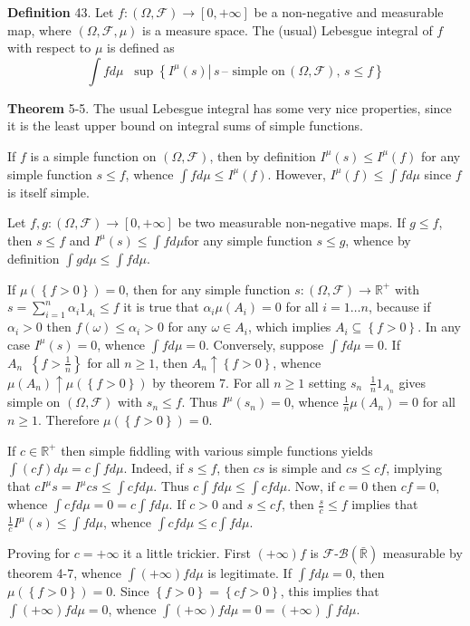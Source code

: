 \documentclass[a4paper]{article}
\newcommand{\obj}[1]{\left\{ #1 \right \}}
\newcommand{\clo}[1]{\left [ #1 \right ]}
\newcommand{\brac}[1]{\left ( #1 \right )}
\newcommand{\induc}[1]{\left . #1 \right \vert}
\newcommand{\Rbar}{{\bar{\mathbb{R}}}}
\newcommand{\Real}{\mathbb{R}}
\newcommand{\Zinf}{\clo{ 0, +\infty }}
\newcommand{\Fcal}{\mathcal{F}}
\newcommand{\borel}[1]{\mathcal{B}\brac{#1}}
\newcommand{\defn}{\mathop{\overset{\Delta}{=}}\nolimits}
\begin{document}
\noindent \textbf{Definition} 43.
Let $f:\brac{\Omega, \Fcal}\to\Zinf$ be a non-negative and measurable map, where $\brac{\Omega, \Fcal, \mu}$ is a measure space. The (usual) Lebesgue integral of $f$ with respect to $\mu$ is defined as \[\int f d\mu\defn\sup\obj{\induc{I^\mu\brac{s}}\,s\,\text{-- simple on}\,\brac{\Omega,\Fcal},\, s\leq f}\]

\label{thm:usual_lebesgue_properties} \noindent \textbf{Theorem} 5-5.
The usual Lebesgue integral has some very nice properties, since it is the least upper bound on integral sums of simple functions.

If $f$ is a simple function on $\brac{\Omega, \Fcal}$, then by definition $I^\mu\brac{s} \leq I^\mu\brac{f}$ for any simple function $s\leq f$, whence $\int f d\mu \leq I^\mu\brac{f}$. However, $I^\mu\brac{f}\leq \int f d\mu$ since $f$ is itself simple.

Let $f,g:\brac{\Omega,\Fcal}\to \Zinf$ be two measurable non-negative maps. If $g\leq f$, then  $s\leq f$ and $I^\mu\brac{s}\leq \int f d\mu$for any simple function $s\leq g$, whence by definition $\int g d\mu\leq \int f d\mu$.

If $\mu\brac{\obj{f>0}}=0$, then for any simple function $s:\brac{\Omega, \Fcal}\to \Real^+$ with $s=\sum_{i=1}^n \alpha_i 1_{A_i} \leq f$ it is true that $\alpha_i \mu\brac{A_i} = 0$ for all $i=1\ldots n$, because if $\alpha_i>0$ then $f\brac{\omega}\leq \alpha_i>0$ for any $\omega\in A_i$, which implies $A_i\subseteq \obj{f>0}$. In any case $I^\mu\brac{s} = 0$, whence $\int f d\mu = 0$. Conversely, suppose $\int f d\mu = 0$. If $A_n\defn\obj{f>\frac{1}{n}}$ for all $n\geq1$, then $A_n \uparrow \obj{f>0}$, whence $\mu\brac{A_n}\uparrow \mu\brac{\obj{f>0}}$ by theorem 7. For all $n\geq1$ setting $s_n\defn \frac{1}{n} 1_{A_n}$ gives simple on $\brac{\Omega, \Fcal}$ with $s_n\leq f$. Thus $I^\mu\brac{s_n} = 0$, whence $\frac{1}{n}\mu\brac{A_n}=0$ for all $n\geq1$. Therefore $\mu\brac{\obj{f > 0}} = 0$.

If $c\in \Real^+$ then simple fiddling with various simple functions yields $\int \brac{cf}d\mu = c\int fd\mu$. Indeed, if $s\leq f$, then $cs$ is simple and $cs\leq cf$, implying that $c I^\mu{s}=I^\mu{c s}\leq \int cf d\mu$. Thus $c \int f d\mu \leq \int cf d\mu$. Now, if $c=0$ then $cf = 0$, whence $\int cf d\mu = 0 = c\int f d \mu$. If $c>0$ and $s\leq cf$, then $\frac{s}{c} \leq f$ implies that $\frac{1}{c} I^\mu\brac{s}\leq \int f d\mu$, whence $\int cf d\mu \leq c \int f d\mu$.

Proving for $c=+\infty$ it a little trickier. First $\brac{+\infty} f$ is $\Fcal$-$\borel{\Rbar}$ measurable by theorem 4-7, whence $\int \brac{+\infty} f d\mu$ is legitimate. If $\int f d\mu = 0$, then $\mu\brac{\obj{f>0}}=0$. Since $\obj{f>0} = \obj{c f>0}$, this implies that $\int \brac{+\infty} f d\mu = 0$, whence $\int \brac{+\infty} f d\mu =0= \brac{+\infty} \int f d\mu$.
\end{document}
